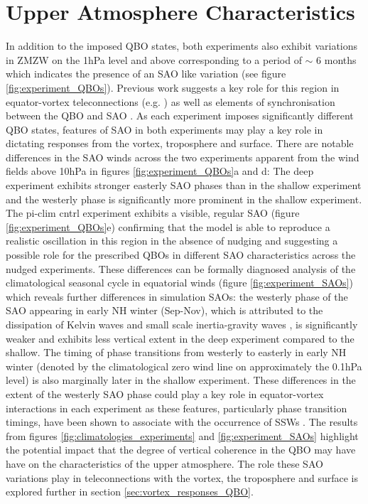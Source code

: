 \section{Upper Atmosphere Characteristics}

In addition to the imposed QBO states, both experiments also exhibit variations in ZMZW on the 1hPa level and above corresponding to a period of $\sim$ 6 months which indicates the presence of an SAO like variation (see figure \ref{fig:experiment_QBOs}). Previous work suggests a key role for this region in equator-vortex teleconnections (e.g. \cite{grayForecasting2020}) as well as elements of synchronisation between the QBO and SAO \citep{kuaiNonstationary2009}. As each experiment imposes significantly different QBO states, features of SAO in both experiments may play a key role in dictating responses from the vortex, troposphere and surface. There are notable differences in the SAO winds across the two experiments apparent from the wind fields above 10hPa in figures \ref{fig:experiment_QBOs}a and d: The deep experiment exhibits stronger easterly SAO phases than in the shallow experiment and the westerly phase is significantly more prominent in the shallow experiment. The pi-clim cntrl experiment exhibits a visible, regular SAO (figure \ref{fig:experiment_QBOs}e) confirming that the model is able to reproduce a realistic oscillation in this region in the absence of nudging and suggesting a possible role for the prescribed QBOs in different SAO characteristics across the nudged experiments. These differences can be formally diagnosed analysis of the climatological seasonal cycle in equatorial winds (figure \ref{fig:experiment_SAOs}) which reveals further differences in simulation SAOs: the westerly phase of the SAO appearing in early NH winter (Sep-Nov), which is attributed to the dissipation of Kelvin waves and small scale inertia-gravity waves \citep{Dunkerton1982, Hitchman1988}, is significantly weaker and exhibits less vertical extent in the deep experiment compared to the shallow. The timing of phase transitions from westerly to easterly in early NH winter (denoted by the climatological zero wind line on approximately the 0.1hPa level) is also marginally later in the shallow experiment. These differences in the extent of the westerly SAO phase could play a key role in equator-vortex interactions in each experiment as these features, particularly phase transition timings, have been shown to associate with the occurrence of SSWs \citep{JGray2001, Hamilton}. The results from figures \ref{fig:climatologies_experiments} and \ref{fig:experiment_SAOs} highlight the potential impact that the degree of vertical coherence in the QBO may have have on the characteristics of the upper atmosphere. The role these SAO variations play in teleconnections with the vortex, the troposphere and surface is explored further in section \ref{sec:vortex_responses_QBO}.

